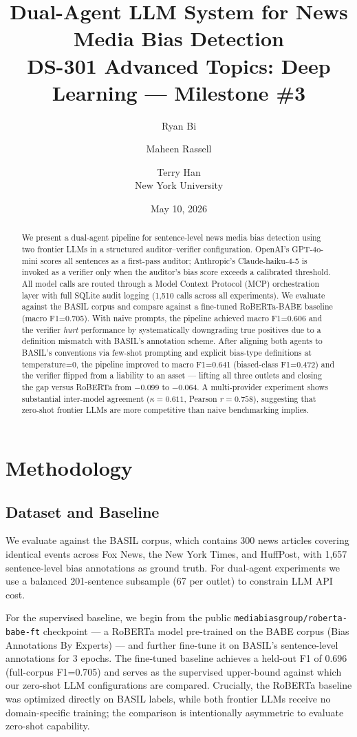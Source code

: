 \documentclass[11pt]{article}
\title{\textbf{Dual-Agent LLM System for News Media Bias Detection}\\
\large DS-301 Advanced Topics: Deep Learning --- Milestone \#3}
\author{Ryan Bi \and Maheen Rassell \and Terry Han \\
\small New York University}
\date{May 10, 2026}
\begin{document}
\maketitle

\begin{abstract}
\noindent
We present a dual-agent pipeline for sentence-level news media bias detection using two frontier LLMs in a structured auditor--verifier configuration. OpenAI's GPT-4o-mini scores all sentences as a first-pass auditor; Anthropic's Claude-haiku-4-5 is invoked as a verifier only when the auditor's bias score exceeds a calibrated threshold. All model calls are routed through a Model Context Protocol (MCP) orchestration layer with full SQLite audit logging (1{,}510 calls across all experiments). We evaluate against the BASIL corpus and compare against a fine-tuned RoBERTa-BABE baseline (macro F1{=}0.705). With naive prompts, the pipeline achieved macro F1{=}0.606 and the verifier \textit{hurt} performance by systematically downgrading true positives due to a definition mismatch with BASIL's annotation scheme. After aligning both agents to BASIL's conventions via few-shot prompting and explicit bias-type definitions at temperature{=}0, the pipeline improved to macro F1{=}0.641 (biased-class F1{=}0.472) and the verifier flipped from a liability to an asset --- lifting all three outlets and closing the gap versus RoBERTa from $-$0.099 to $-$0.064. A multi-provider experiment shows substantial inter-model agreement ($\kappa{=}0.611$, Pearson $r{=}0.758$), suggesting that zero-shot frontier LLMs are more competitive than naive benchmarking implies.
\end{abstract}

\section{Methodology}

\subsection{Dataset and Baseline}
We evaluate against the BASIL corpus, which contains 300 news articles covering identical events across Fox News, the New York Times, and HuffPost, with 1{,}657 sentence-level bias annotations as ground truth. For dual-agent experiments we use a balanced 201-sentence subsample (67 per outlet) to constrain LLM API cost.

For the supervised baseline, we begin from the public \texttt{mediabiasgroup/roberta-babe-ft} checkpoint --- a RoBERTa model pre-trained on the BABE corpus (Bias Annotations By Experts) --- and further fine-tune it on BASIL's sentence-level annotations for 3 epochs. The fine-tuned baseline achieves a held-out F1 of 0.696 (full-corpus F1{=}0.705) and serves as the supervised upper-bound against which our zero-shot LLM configurations are compared. Crucially, the RoBERTa baseline was optimized directly on BASIL labels, while both frontier LLMs receive no domain-specific training; the comparison is intentionally asymmetric to evaluate zero-shot capability.
\end{document}
